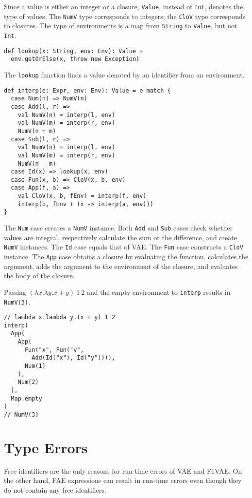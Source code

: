 Since a value is either an integer or a closure, \verb!Value!, instead of
\verb!Int!, denotes the type of values. The \verb!NumV! type corresponds to
integers; the \verb!CloV! type corresponds to closures. The type of environments
is a map from \verb!String! to \verb!Value!, but not \verb!Int!.

\begin{verbatim}
def lookup(x: String, env: Env): Value =
  env.getOrElse(x, throw new Exception)
\end{verbatim}

The \verb!lookup! function finds a value denoted by an identifier from an
environment.

\begin{verbatim}
def interp(e: Expr, env: Env): Value = e match {
  case Num(n) => NumV(n)
  case Add(l, r) =>
    val NumV(n) = interp(l, env)
    val NumV(m) = interp(r, env)
    NumV(n + m)
  case Sub(l, r) =>
    val NumV(n) = interp(l, env)
    val NumV(m) = interp(r, env)
    NumV(n - m)
  case Id(x) => lookup(x, env)
  case Fun(x, b) => CloV(x, b, env)
  case App(f, a) =>
    val CloV(x, b, fEnv) = interp(f, env)
    interp(b, fEnv + (x -> interp(a, env)))
}
\end{verbatim}

The \verb!Num! case creates a \verb!NumV! instance. Both \verb!Add! and
\verb!Sub! cases check whether values are integral, respectively calculate the
sum or the difference, and create \verb!NumV! instances. The \verb!Id! case
equals that of VAE. The \verb!Fun! case constructs a \verb!CloV! instance. The
\verb!App! case obtains a closure by evaluating the function, calculates the
argument, adds the argument to the environment of the closure, and evaluates the
body of the closure.

Passing \((\lambda x.\lambda y.x+y)\ 1\ 2\) and the empty environment to
\verb!interp! results in \verb!NumV(3)!.

\begin{verbatim}
// lambda x.lambda y.(x + y) 1 2
interp(
  App(
    App(
      Fun("x", Fun("y",
        Add(Id("x"), Id("y")))),
      Num(1)
    ),
    Num(2)
  ),
  Map.empty
)
// NumV(3)
\end{verbatim}

\section{Type Errors}

Free identifiers are the only reasons for run-time errors of VAE and F1VAE. On
the other hand, FAE expressions can result in run-time errors even though they do
not contain any free identifiers.

